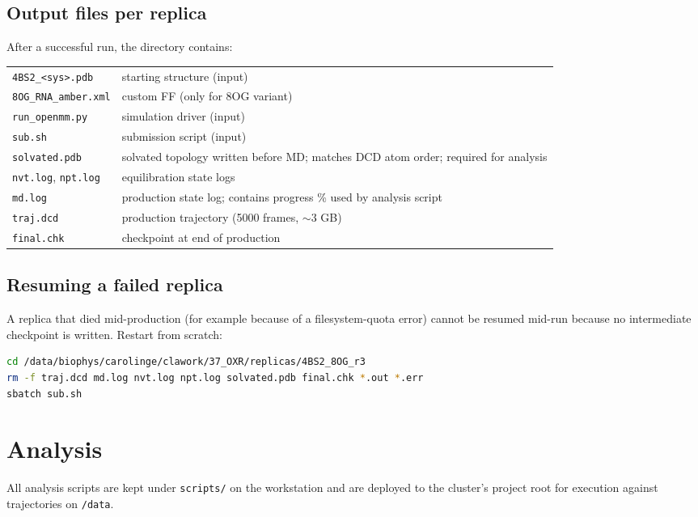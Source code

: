 \documentclass[11pt,a4paper]{article}
\begin{document}
\subsection{Output files per replica}
After a successful run, the directory contains:
\begin{tabular}{lp{8.6cm}}
\toprule
\texttt{4BS2\_<sys>.pdb} & starting structure (input) \\
\texttt{8OG\_RNA\_amber.xml} & custom FF (only for 8OG variant) \\
\texttt{run\_openmm.py} & simulation driver (input) \\
\texttt{sub.sh} & submission script (input) \\
\texttt{solvated.pdb} & solvated topology written before MD; matches DCD atom order; required for analysis \\
\texttt{nvt.log}, \texttt{npt.log} & equilibration state logs \\
\texttt{md.log} & production state log; contains progress \% used by analysis script \\
\texttt{traj.dcd} & production trajectory (5000 frames, $\sim$3 GB) \\
\texttt{final.chk} & checkpoint at end of production \\
\bottomrule
\end{tabular}

\subsection{Resuming a failed replica}
A replica that died mid-production (for example because of a
filesystem-quota error) cannot be resumed mid-run because no
intermediate checkpoint is written. Restart from scratch:

\begin{lstlisting}[language=bash]
cd /data/biophys/carolinge/clawork/37_OXR/replicas/4BS2_8OG_r3
rm -f traj.dcd md.log nvt.log npt.log solvated.pdb final.chk *.out *.err
sbatch sub.sh
\end{lstlisting}

\section{Analysis}
\label{sec:anal}

All analysis scripts are kept under \texttt{scripts/} on the
workstation and are deployed to the cluster's project root for
execution against trajectories on \texttt{/data}.
\end{document}
